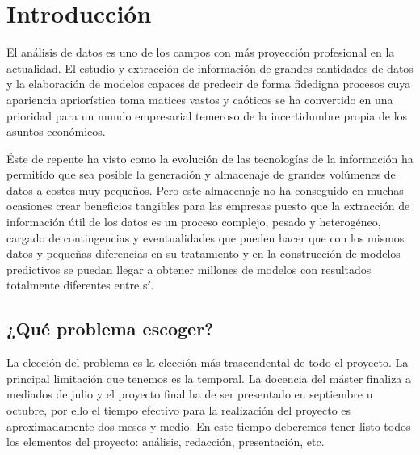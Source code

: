 \documentclass[11pt,a4paper,spanish]{article} %
\begin{document}
\doublespacing %
\tableofcontents
\newpage %


\renewcommand{\listtablename}{Índice de tablas}
\listoftables
\newpage

\renewcommand{\listfigurename}{Índice de gráficos}
\listoffigures
\newpage

\setlength{\parskip}{1em}

\singlespacing %

\section{Introducción}
El análisis de datos es uno de los campos con más proyección profesional en la actualidad. El estudio y extracción de información de grandes cantidades de datos y la elaboración de modelos capaces de predecir de forma fidedigna procesos cuya apariencia apriorística toma matices vastos y caóticos se ha convertido en una prioridad para un mundo empresarial temeroso de la incertidumbre propia de los asuntos económicos. 

Éste de repente ha visto como la evolución de las tecnologías de la información ha permitido que sea posible la generación y almacenaje de grandes volúmenes de datos a costes muy pequeños. Pero este almacenaje no ha conseguido en muchas ocasiones crear beneficios tangibles para las empresas puesto que la extracción de información útil de los datos es un proceso complejo, pesado y heterogéneo, cargado de contingencias y eventualidades que pueden hacer que con los mismos datos y pequeñas diferencias en su tratamiento y en la construcción de modelos predictivos se puedan llegar a obtener millones de modelos con resultados totalmente diferentes entre sí. 

\subsection{¿Qué problema escoger?}
La elección del problema es la elección más trascendental de todo el proyecto. La principal limitación que tenemos es la temporal. La docencia del máster finaliza a mediados de julio y el proyecto final ha de ser presentado en septiembre u octubre, por ello el tiempo efectivo para la realización del proyecto es aproximadamente dos meses y medio. En este tiempo deberemos tener listo todos los elementos del proyecto: análisis, redacción, presentación, etc. 
\end{document}

